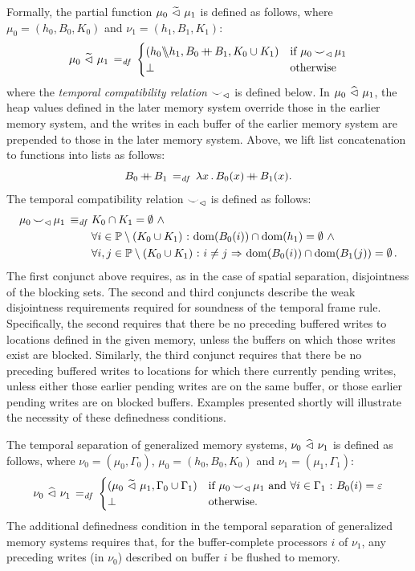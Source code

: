 \documentclass[11pt]{report}         %
\begin{document}
Formally, the partial function $\mu_0 \operatorname{\,\widetilde{\vartriangleleft}\,} \mu_1$ is defined as follows, where $\mu_0 = (h_0,B_0,K_0)$ and $\nu_1 = (h_1,B_1,K_1)$:
\[ \mu_0 \operatorname{\,\widetilde{\vartriangleleft}\,} \mu_1 \operatorname{\;=_{\mathit{df}}\;} \begin{cases}
  (h_0 \backslash\!\!\backslash h_1, B_0 \operatorname{+\!\!\!+} B_1, K_0 \cup K_1) & \text{if $\mu_0 \operatorname{\smile}_\vartriangleleft \mu_1$} \\ 
  \bot & \text{otherwise}
\end{cases}\] where the \emph{temporal compatibility relation} $\operatorname{\smile}_\vartriangleleft$ is defined below. In $\mu_0 \operatorname{\,\widehat{\vartriangleleft}\,} \mu_1$, the heap values defined in the later memory system override those in the earlier memory system, and the writes in each buffer of the earlier memory system are prepended to those in the later memory system. Above, we lift list concatenation to functions into lists as follows: \[ B_0 \operatorname{+\!\!\!+} B_1 \operatorname{\;=_{\mathit{df}}\;} \lambda x\,.\, B_0(x) \operatorname{+\!\!\!+} B_1(x).\]
The temporal compatibility relation $\operatorname{\smile}_\vartriangleleft$ is defined as follows: 
\begin{align*}
\mu_0 \operatorname{\smile}_\vartriangleleft \mu_1 \operatorname{\;\equiv_{\mathit{df}}\;} & K_0 \cap K_1 = \operatorname{\emptyset} \operatorname{\,\wedge\,} \\ 
  & \forall i \in \mathbb{P} \setminus (K_0 \cup K_1) \operatorname{\,:\,} \operatorname{\mathrm{dom}}(B_0(i)) \cap \operatorname{\mathrm{dom}}(h_1) = \operatorname{\emptyset} \operatorname{\,\wedge\,} \\  
  & \forall i,j \in \mathbb{P} \setminus (K_0 \cup K_1) \operatorname{\,:\,} i \neq j \operatorname{\,\Rightarrow\,} \operatorname{\mathrm{dom}}(B_0(i)) \cap \operatorname{\mathrm{dom}}(B_1(j)) = \operatorname{\emptyset}. 
\end{align*} The first conjunct above requires, as in the case of spatial separation, disjointness of the blocking sets. The second and third conjuncts describe the weak disjointness requirements required for soundness of the temporal frame rule. Specifically, the second requires that there be no preceding buffered writes to locations defined in the given memory, unless the buffers on which those writes exist are blocked. Similarly, the third conjunct requires that there be no preceding buffered writes to locations for which there currently pending writes, unless either those earlier pending writes are on the same buffer, or those earlier pending writes are on blocked buffers. Examples presented shortly will illustrate the necessity of these definedness conditions. 

The temporal separation of generalized memory systems, $\nu_0 \operatorname{\,\widehat{\vartriangleleft}\,} \nu_1$ is defined as follows, where $\nu_0 = (\mu_0,\Gamma_0)$, $\mu_0 = (h_0,B_0,K_0)$ and $\nu_1 = (\mu_1,\Gamma_1)$: \[ \nu_0 \operatorname{\,\widehat{\vartriangleleft}\,} \nu_1 \operatorname{\;=_{\mathit{df}}\;} \begin{cases}
  (\mu_0 \operatorname{\,\widetilde{\vartriangleleft}\,} \mu_1,\Gamma_0 \cup \Gamma_1) & \text{if $\mu_0 \operatorname{\smile}_\vartriangleleft \mu_1$ and $\forall i \in \Gamma_1 \operatorname{\,:\,} B_0(i) = \varepsilon$} \\ 
  \bot & \text{otherwise.}
\end{cases}\] The additional definedness condition in the temporal separation of generalized memory systems requires that, for the buffer-complete processors $i$ of $\nu_1$, any preceding writes (in $\nu_0$) described on buffer $i$ be flushed to memory.
\end{document}
